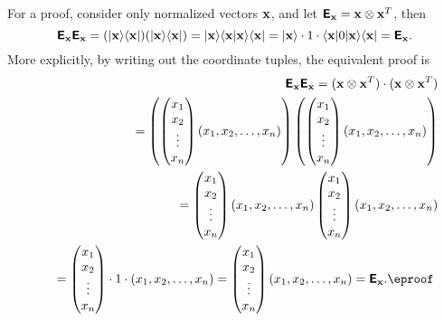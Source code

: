 {\color{OliveGreen}
\bproof
For a proof, consider only normalized vectors ${\bf x}$, and
let $\textsf{\textbf{E}}_{\bf x} = {\bf x}\otimes {\bf x}^T $,
then
$$
\textsf{\textbf{E}}_{\bf x}\textsf{\textbf{E}}_{\bf x}
=
(\vert{\bf x}\rangle \langle {\bf x}\vert)
(\vert{\bf x}\rangle \langle {\bf x}\vert)
=
\vert{\bf x}\rangle \langle {\bf x}\vert {\bf x}\rangle \langle {\bf x}\vert
=\vert{\bf x}\rangle \cdot 1 \cdot \langle {\bf x}\vert0
\vert{\bf x}\rangle \langle {\bf x}\vert
=  \textsf{\textbf{E}}_{\bf x}.
$$
More explicitly, by writing out the coordinate tuples, the equivalent proof is
\begin{equation}
\begin{split}
\textsf{\textbf{E}}_{\bf x}\textsf{\textbf{E}}_{\bf x}
= ({\bf x}\otimes {\bf x}^T ) \cdot ({\bf x}\otimes {\bf x}^T )
\\
\qquad
=
\left(
\begin{pmatrix}
x_1\\
x_2\\
\vdots \\
x_n
\end{pmatrix}
(x_1,x_2,\ldots ,x_n)
\right)
\left(
\begin{pmatrix}
x_1\\
x_2\\
\vdots \\
x_n
\end{pmatrix}
(x_1,x_2,\ldots ,x_n)
 \right)
\\
\qquad
=
\begin{pmatrix}
x_1\\
x_2\\
\vdots \\
x_n
\end{pmatrix}
(x_1,x_2,\ldots ,x_n)
\begin{pmatrix}
x_1\\
x_2\\
\vdots \\
x_n
\end{pmatrix}
(x_1,x_2,\ldots ,x_n)
\\
\qquad
=
\begin{pmatrix}
x_1\\
x_2\\
\vdots \\
x_n
\end{pmatrix}
\cdot 1 \cdot
(x_1,x_2,\ldots ,x_n)
=
\begin{pmatrix}
x_1\\
x_2\\
\vdots \\
x_n
\end{pmatrix}
(x_1,x_2,\ldots ,x_n)
=\textsf{\textbf{E}}_{\bf x}. \textrm{\eproof }
\end{split}
\end{equation}
}

